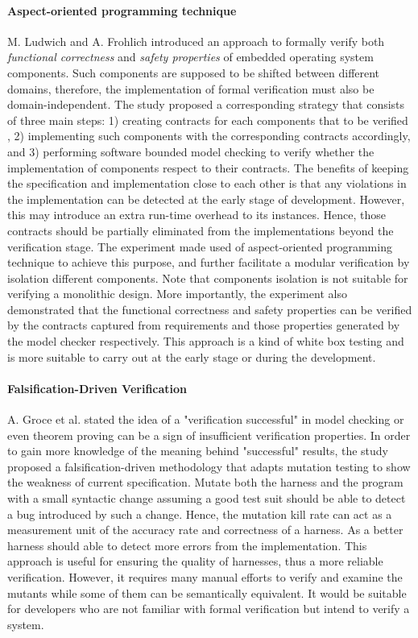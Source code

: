 \paragraph{Aspect-oriented programming technique} M. Ludwich and A. Frohlich \cite{Ludwich:2013:FVC:2433140.2433148} introduced an approach to formally verify both \textit{functional correctness} and \textit{safety properties} of embedded operating system components. Such components are supposed to be shifted between different domains, therefore, the implementation of formal verification must also be domain-independent. The study proposed a corresponding strategy that consists of three main steps: 1) creating contracts for each components that to be verified , 2) implementing such components with the corresponding contracts accordingly, and 3) performing software bounded model checking to verify whether the implementation of components respect to their contracts. The benefits of keeping the specification and implementation close to each other is that any violations in the implementation can be detected at the early stage of development. However, this may introduce an extra run-time overhead to its instances. Hence, those contracts should be partially eliminated from the implementations beyond the verification stage. The experiment made used of aspect-oriented programming technique to achieve this purpose, and further facilitate a modular verification by isolation different components. Note that components isolation is not suitable for verifying a monolithic design. More importantly, the experiment also demonstrated that the functional correctness and safety properties can be verified by the contracts captured from requirements and those properties generated by the model checker respectively. This approach is a kind of white box testing and is more suitable to carry out at the early stage or during the development.

\paragraph{Falsification-Driven Verification} A. Groce et al. \cite{7372062} stated the idea of a "verification successful" in model checking or even theorem proving can be a sign of insufficient verification properties. In order to gain more knowledge of the meaning behind "successful" results, the study proposed a falsification-driven methodology that adapts mutation testing to show the weakness of current specification. Mutate both the harness and the program with a small syntactic change assuming a good test suit should be able to detect a bug introduced by such a change. Hence, the mutation kill rate can act as a measurement unit of the accuracy rate and correctness of a harness. As a better harness should able to detect more errors from the implementation. This approach is useful for ensuring the quality of harnesses, thus a more reliable verification. However, it requires many manual efforts to verify and examine the mutants while some of them can be semantically equivalent. It would be suitable for developers who are not familiar with formal verification but intend to verify a system.


